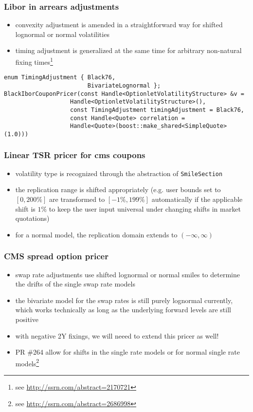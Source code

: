 \documentclass[10pt,German]{beamer}
\begin{document}
\begin{frame}[fragile]
\frametitle{Libor in arrears adjustments}
\begin{itemize}
\item convexity adjustment is amended in a straightforward way for  shifted lognormal or normal volatilities
\item timing adjustment is generalized at the same time for arbitrary non-natural fixing times\footnote{see \url{http://ssrn.com/abstract=2170721}}
\end{itemize}
\begin{verbatim}
enum TimingAdjustment { Black76,
                        BivariateLognormal };
BlackIborCouponPricer(const Handle<OptionletVolatilityStructure> &v =
                   Handle<OptionletVolatilityStructure>(),
                   const TimingAdjustment timingAdjustment = Black76,
                   const Handle<Quote> correlation =
                   Handle<Quote>(boost::make_shared<SimpleQuote>(1.0)))
\end{verbatim}
\end{frame}

\begin{frame}[fragile]
\frametitle{Linear TSR pricer for cms coupons}
\begin{itemize}
\item volatility type is recognized through the abstraction of \verb+SmileSection+
\item the replication range is shifted appropriately (e.g. user bounds set to $[0,200\%]$ are transformed to $[-1\%,199\%]$ automatically if the applicable shift is $1\%$ to keep the user input universal under changing shifts in market quotations)
\item for a normal model, the replication domain extends to $(-\infty,\infty)$
\end{itemize}
\end{frame}

\begin{frame}[fragile]
\frametitle{CMS spread option pricer}
\begin{itemize}
\item swap rate adjustments use shifted lognormal or normal smiles to determine the drifts of the single swap rate models
\item the bivariate model for the swap rates is still purely lognormal currently, which works technically as long as the underlying forward levels are still positive
\item with negative 2Y fixings, we will neeed to extend this pricer as well!
\item PR \#264 allow for shifts in the single rate models or for normal single rate models\footnote{see \url{http://ssrn.com/abstract=2686998}}
\end{itemize}
\end{frame}
\end{document}
